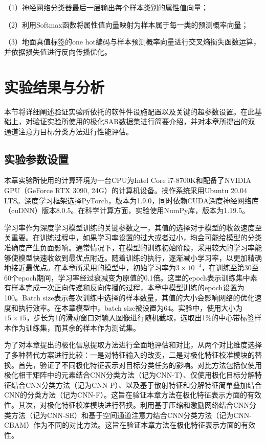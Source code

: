 （1）神经网络分类器最后一层输出每个样本类别的属性值向量；

（2）利用Softmax函数将属性值向量映射为样本属于每一类的预测概率向量；

（3）地面真值标签的one hot编码与样本预测概率向量进行交叉熵损失函数运算，并依据损失值进行反向传播优化。


\section{实验结果与分析}
本节将详细阐述验证实验所依托的软件件设施配置以及关键的超参数设置。在此基础上，对验证实验所使用的极化SAR数据集进行简要介绍，并对本章所提出的双通道注意力目标分类方法进行性能评估。

\subsection{实验参数设置}
本章实验所使用的计算环境为一台CPU为Intel Core i7-8700K和配备了NVIDIA GPU（GeForce RTX 3090, 24G）的计算机设备。操作系统采用Ubuntu 20.04 LTS。深度学习框架选择PyTorch，版本为1.9.0，同时依赖CUDA深度神经网络库（cuDNN）版本8.0.5。在科学计算方面，实验使用NumPy库，版本为1.19.5。

学习率作为深度学习模型训练的关键参数之一，其值的选择对于模型的收敛速度至关重要。在训练过程中，如果学习率设置的过大或者过小，均会可能给模型的分类准确度产生负面影响。通常情况下，在模型的训练初始阶段，采用较大的学习率能够使模型快速收敛到最优点附近。随着训练的执行，逐渐减小学习率，以更加精确地接近最优点。在本章所采用的模型中，初始学习率为$3\times 10^{-4}$，在训练至第30至60个epoch期间，学习率经过衰减变为原值的0.1倍。这里的epoch表示训练集中素有样本完成一次正向传递和反向传播的过程，本章中模型训练的epoch设置为100。Batch size表示每次训练中选择的样本数量，其值的大小会影响网络的优化速度和执行效率。在本章模型中，batch size被设置为64。实验中，使用大小为$15 \times 15$，步长为1的滑动窗口对输入图像进行随机截取，选取出1\%的中心带标签样本作为训练集，而其余的样本作为测试集。

为了对本章提出的极化信息提取方法进行全面地评估和对比，从两个对比维度选择了多种替代方案进行比较：一是对特征输入的改变，二是对极化特征校准模块的替换。首先，验证了不同极化特征表示对目标分类任务的影响。对比方法包括仅使用极化相干矩阵中的元素结合CNN分类方法（记为CNN-T）、仅使用极化目标分解特征结合CNN分类方法（记为CNN-P）、以及基于散射特征和分解特征简单叠加结合CNN的分类方法（记为CNN-F）。这旨在验证本章方法在极化特征表示方面的有效性。其次，对极化特征校准模块进行替换。利用基于压缩和激励网络结合CNN分类方法（记为CNN-SE）和基于空间通道注意力结合CNN分类方法（记为CNN-CBAM）作为不同的对比方法。这旨在验证本章方法在极化特征表示方面的有效性。

